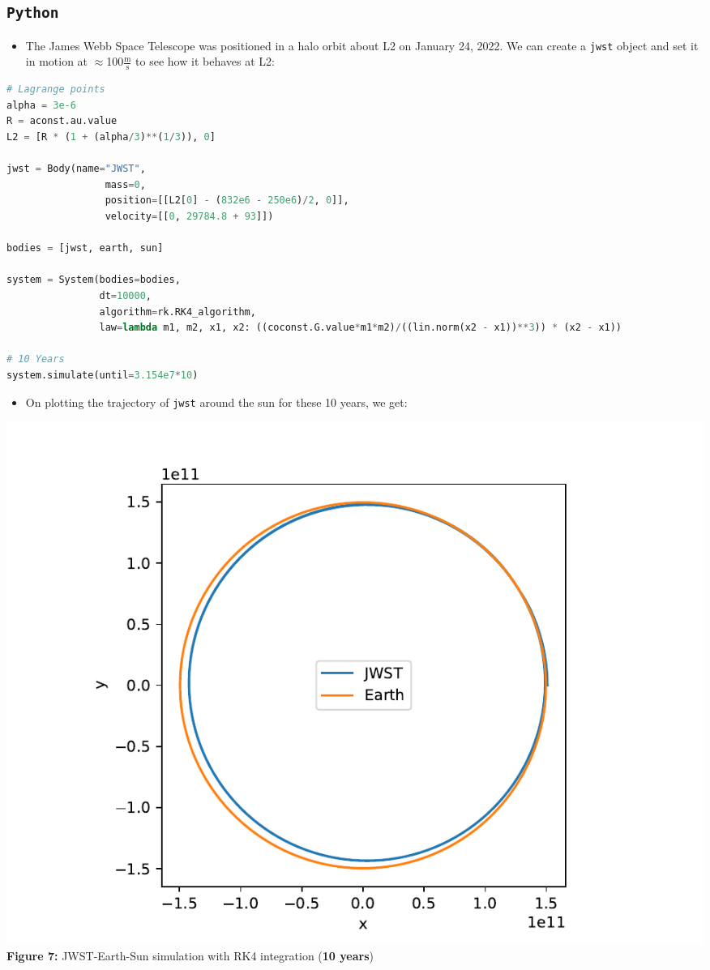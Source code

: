 \documentclass[11pt]{article}
\newcommand{\psubsubsection}[1]{{\subsection*{#1}}}
\begin{document}
    \psubsubsection{\texttt{Python}}
    \begin{itemize}
        \item The James Webb Space Telescope was positioned in a halo orbit about L2 on January 24, 2022. We can create a \texttt{jwst} object and set it in motion at $\approx$100$\frac{\text{m}}{\text{s}}$ to see how it behaves at L2:
    \end{itemize}
    \begin{lstlisting}[language=Python, caption=Simulate the system for 10 years]
# Lagrange points
alpha = 3e-6
R = aconst.au.value
L2 = [R * (1 + (alpha/3)**(1/3)), 0]

jwst = Body(name="JWST",
                 mass=0,
                 position=[[L2[0] - (832e6 - 250e6)/2, 0]],
                 velocity=[[0, 29784.8 + 93]])

bodies = [jwst, earth, sun]

system = System(bodies=bodies,
                dt=10000,
                algorithm=rk.RK4_algorithm,
                law=lambda m1, m2, x1, x2: ((coconst.G.value*m1*m2)/((lin.norm(x2 - x1))**3)) * (x2 - x1))

# 10 Years
system.simulate(until=3.154e7*10)
    \end{lstlisting}

    \begin{itemize}
        \item On plotting the trajectory of \texttt{jwst} around the sun for these 10 years, we get:
    \end{itemize}

    \begin{center}
        \includegraphics[scale = 0.8]{images/rk4_jwst}
        \\ \caption{\textbf{Figure 7:} JWST-Earth-Sun simulation with RK4 integration (\textbf{10 years})}
        \label{fig:fig7}
    \end{center}
    
\end{document}
